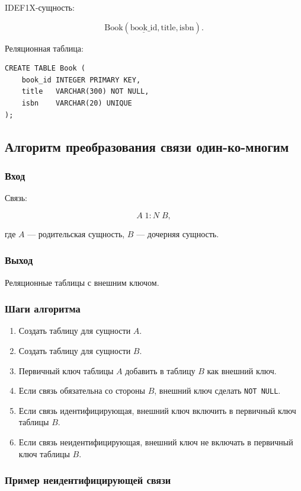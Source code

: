 \documentclass[12pt,a4paper]{article}
\theoremstyle{remark}
\begin{document}
IDEF1X-сущность:

\[
    \text{Book}(\underline{\text{book\_id}}, \text{title}, \text{isbn}).
\]

Реляционная таблица:

\begin{verbatim}
CREATE TABLE Book (
    book_id INTEGER PRIMARY KEY,
    title   VARCHAR(300) NOT NULL,
    isbn    VARCHAR(20) UNIQUE
);
\end{verbatim}

\subsection{Алгоритм преобразования связи один-ко-многим}

\subsubsection*{Вход}

Связь:

\[
    A \; 1 : N \; B,
\]

где $A$ --- родительская сущность, $B$ --- дочерняя сущность.

\subsubsection*{Выход}

Реляционные таблицы с внешним ключом.

\subsubsection*{Шаги алгоритма}

\begin{enumerate}
    \item Создать таблицу для сущности $A$.
    \item Создать таблицу для сущности $B$.
    \item Первичный ключ таблицы $A$ добавить в таблицу $B$ как внешний ключ.
    \item Если связь обязательна со стороны $B$, внешний ключ сделать \texttt{NOT NULL}.
    \item Если связь идентифицирующая, внешний ключ включить в первичный ключ таблицы $B$.
    \item Если связь неидентифицирующая, внешний ключ не включать в первичный ключ таблицы $B$.
\end{enumerate}

\subsubsection*{Пример неидентифицирующей связи}
\end{document}
